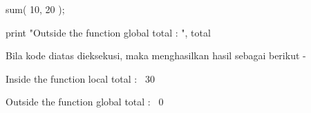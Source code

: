\documentclass[a4paper,12pt]{report}
\begin{document}
 \hspace*{0.5in} sum( 10, 20 ); \par
\noindent 
 \hspace*{0.5in} print "Outside the function global total : ", total  \par
\begin{adjustwidth}{0.03in}{0.03in}
Bila kode diatas dieksekusi, maka menghasilkan hasil sebagai berikut -\end{adjustwidth}
 \par
\noindent 
 \hspace*{0.5in} Inside the function local total :~ 30 \par
\noindent 
 \hspace*{0.5in} Outside the function global total :~ 0 \par
 \hspace*{0.5in} \vspace{12pt}
\vspace{12pt}
\end{document}
